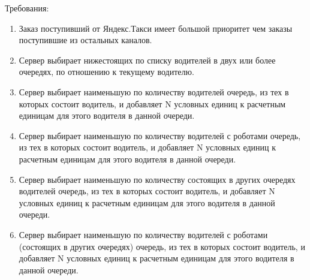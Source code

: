 		Требования:

		\begin{enumerate}
			\item{Заказ поступивший от Яндекс.Такси имеет большой приоритет чем заказы поступившие из остальных каналов.}

			\item{Сервер выбирает нижестоящих по списку водителей в двух или более очередях, по отношению к текущему водителю.}

			\item{Сервер выбирает наименьшую по количеству водителей очередь, из тех в которых состоит водитель, и добавляет N условных единиц к расчетным единицам для этого водителя в данной очереди.}

			\item{Сервер выбирает наименьшую по количеству водителей с роботами очередь, из тех в которых состоит водитель, и добавляет N условных единиц к расчетным единицам для этого водителя в данной очереди.}

			\item{Сервер выбирает наименьшую по количеству состоящих в других очередях водителей очередь, из тех в которых состоит водитель, и добавляет N условных единиц к расчетным единицам для этого водителя в данной очереди.}

			\item{Сервер выбирает наименьшую по количеству водителей с роботами (состоящих в других очередях) очередь, из тех в которых состоит водитель, и добавляет N условных единиц к расчетным единицам для этого водителя в данной очереди.}
		\end{enumerate}


